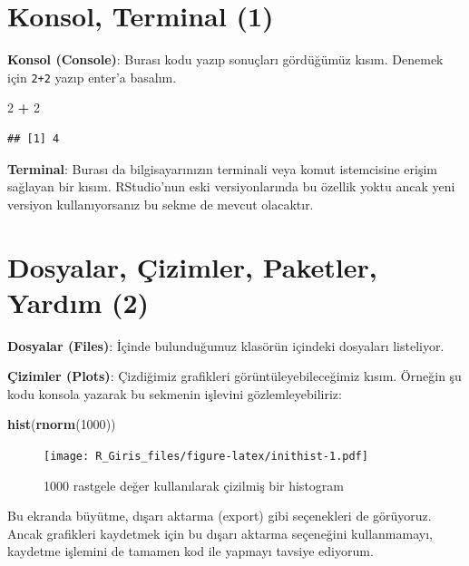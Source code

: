 \documentclass[
]{book}
\newenvironment{Shaded}{\begin{snugshade}}{\end{snugshade}}
\newcommand{\DecValTok}[1]{\textcolor[rgb]{0.00,0.00,0.81}{#1}}
\newcommand{\KeywordTok}[1]{\textcolor[rgb]{0.13,0.29,0.53}{\textbf{#1}}}
\newcommand{\NormalTok}[1]{#1}
\newcommand{\OperatorTok}[1]{\textcolor[rgb]{0.81,0.36,0.00}{\textbf{#1}}}
\newcommand{\StringTok}[1]{\textcolor[rgb]{0.31,0.60,0.02}{#1}}
\begin{document}
\hypertarget{konsol-terminal-1}{%
\section{Konsol, Terminal (1)}\label{konsol-terminal-1}}

\textbf{Konsol (Console)}: Burası kodu yazıp sonuçları gördüğümüz kısım. Denemek için \texttt{2+2} yazıp enter'a basalım.

\begin{Shaded}
\begin{Highlighting}[]
\DecValTok{2} \OperatorTok{+}\StringTok{ }\DecValTok{2}
\end{Highlighting}
\end{Shaded}

\begin{verbatim}
## [1] 4
\end{verbatim}

\textbf{Terminal}: Burası da bilgisayarınızın terminali veya komut istemcisine erişim sağlayan bir kısım. RStudio'nun eski versiyonlarında bu özellik yoktu ancak yeni versiyon kullanıyorsanız bu sekme de mevcut olacaktır.

\hypertarget{dosyalar-uxe7izimler-paketler-yardux131m-2}{%
\section{Dosyalar, Çizimler, Paketler, Yardım (2)}\label{dosyalar-uxe7izimler-paketler-yardux131m-2}}

\textbf{Dosyalar (Files)}: İçinde bulunduğumuz klasörün içindeki dosyaları listeliyor.

\textbf{Çizimler (Plots)}: Çizdiğimiz grafikleri görüntüleyebileceğimiz kısım. Örneğin şu kodu konsola yazarak bu sekmenin işlevini gözlemleyebiliriz:

\begin{Shaded}
\begin{Highlighting}[]
\KeywordTok{hist}\NormalTok{(}\KeywordTok{rnorm}\NormalTok{(}\DecValTok{1000}\NormalTok{))}
\end{Highlighting}
\end{Shaded}

\begin{figure}
\centering
\texttt{[image: R\_Giris\_files/figure-latex/inithist-1.pdf]}
\caption{\label{fig:inithist}1000 rastgele değer kullanılarak çizilmiş bir histogram}
\end{figure}

Bu ekranda büyütme, dışarı aktarma (export) gibi seçenekleri de görüyoruz. Ancak grafikleri kaydetmek için bu dışarı aktarma seçeneğini kullanmamayı, kaydetme işlemini de tamamen kod ile yapmayı tavsiye ediyorum.
\end{document}
